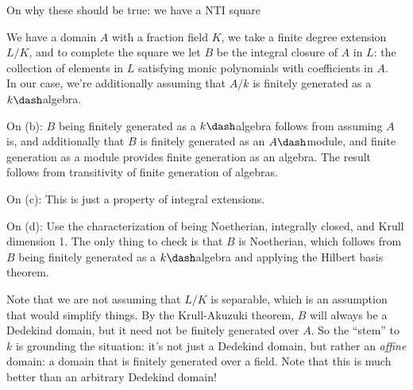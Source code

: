 \begin{remark}

On why these should be true: we have a NTI square

\begin{center}\end{center}

We have a domain \(A\) with a fraction field \(K\), we take a finite
degree extension \(L/K\), and to complete the square we let \(B\) be the
integral closure of \(A\) in \(L\): the collection of elements in \(L\)
satisfying monic polynomials with coefficients in \(A\).\\

In our case, we're additionally assuming that \(A/k\) is finitely
generated as a \(k\dash\)algebra.

\end{remark}

\begin{remark}

\envlist

On (b): \(B\) being finitely generated as a \(k\dash\)algebra follows
from assuming \(A\) is, and additionally that \(B\) is finitely
generated as an \(A\dash\)module, and finite generation as a module
provides finite generation as an algebra. The result follows from
transitivity of finite generation of algebras.

On (c): This is just a property of integral extensions.

On (d): Use the characterization of being Noetherian, integrally closed,
and Krull dimension 1. The only thing to check is that \(B\) is
Noetherian, which follows from \(B\) being finitely generated as a
\(k\dash\)algebra and applying the Hilbert basis theorem.

\end{remark}

\begin{remark}

Note that we are not assuming that \(L/K\) is separable, which is an
assumption that would simplify things. By the Krull-Akuzuki theorem,
\(B\) will always be a Dedekind domain, but it need not be finitely
generated over \(A\). So the ``stem'' to \(k\) is grounding the
situation: it's not just a Dedekind domain, but rather an \emph{affine}
domain: a domain that is finitely generated over a field. Note that this
is much better than an arbitrary Dedekind domain!

\end{remark}

